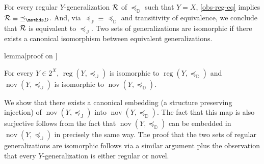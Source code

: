 \documentclass[12pt,a4paper,twoside]{article}
\newcommand{\reg}{\operatorname{reg}}
\newcommand{\nov}{\operatorname{nov}}
\newcommand{\preceqb}{\mathbin{\preceq}}
\newcommand{\ext}{\mathrel{\mc R}}
\newcommand{\extb}{\mathbin{\mc R}}
\newcommand{\mbbd}{{\mathds D}}
\newcommand{\mbbi}{{\mathds L}}
\newcommand{\mbbj}{\mathds J}
\begin{document}
\begin{appendices}
 For every regular $Y$-{generalization} $\ext$ of $\preceq_{\mbbd}$ such that $Y=X$,
 \cref{obs-reg-eq} implies $\extb\equiv \preceqb_{\mbbd}$. And, via
 $\preceqb_{\mbbj}\equiv \preceqb_{\mbbd}$ and transitivity of equivalence, we
 conclude that $\ext$ is equivalent to $\preceq_{\mbbj}$.  Two sets of
 {generalization}s are isomorphic if there exists a canonical isomorphism between
 equivalent {generalization}s. 


\begin{theoremEnd}{lemma}[proof on ]
  \label{lem-nov-iso}

  For every $Y \in 2^{X}$, $\reg(Y, \preceqb_{\mbbj})$ is isomorphic to
  $\reg(Y,\preceqb_{\mbbd})$ and
  $\nov ( Y , \preceqb_{\mbbj} )$ is isomorphic to $\nov ( Y , \preceqb _ \mbbd )$.


\end{theoremEnd}
\begin{proofEnd}%
  \label{proof-nov-iso}

  We show that there exists a canonical embedding (a structure preserving
  injection) of $\nov ( Y , \preceqb _ \mbbj )$ into
  $\nov ( Y , \preceqb _ \mbbd )$. The fact that this map is also
  surjective follows from the fact that $\nov ( Y , \preceqb _ \mbbd )$
  can be embedded in $\nov ( Y , \preceqb _ \mbbj )$ in precisely the same
  way. The proof that the two sets of regular {generalization}s are isomorphic follows
  via a similar argument plus the observation that every $Y$-{generalization} is either
  regular or novel.


\end{proofEnd}
\end{appendices}
\end{document}
